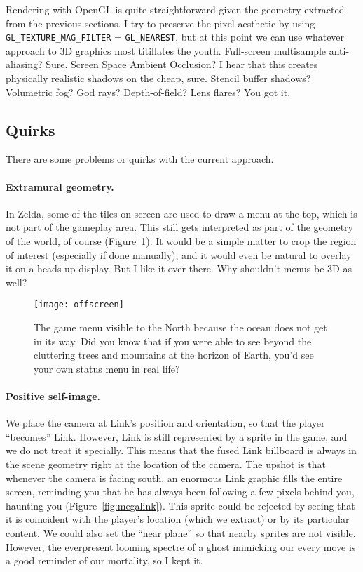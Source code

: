 \documentclass[twocolumn]{article}
\begin{document}
Rendering with OpenGL is quite straightforward given the geometry
extracted from the previous sections. I try to preserve the pixel
aesthetic by using \verb+GL_TEXTURE_MAG_FILTER+ = \verb+GL_NEAREST+,
but at this point we can use whatever approach to 3D graphics most
titillates the youth. Full-screen multisample anti-aliasing? Sure.
Screen Space Ambient Occlusion? I hear that this creates physically
realistic shadows on the cheap, sure. Stencil buffer shadows?
Volumetric fog? God rays? Depth-of-field? Lens flares? You got it.

\subsection{Quirks}
There are some problems or quirks with the current approach.

\paragraph{Extramural geometry.}
In Zelda, some of the tiles on screen are used to draw a menu at the
top, which is not part of the gameplay area. This still gets
interpreted as part of the geometry of the world, of course
(Figure~\ref{fig:offscreen}). It would be a simple matter to crop the
region of interest (especially if done manually), and it would even be
natural to overlay it on a heads-up display. But I like it over there.
Why shouldn't menus be 3D as well?

\begin{figure}[ht]
\begin{center}
\texttt{[image: offscreen]}
\end{center}\vspace{-0.1in}
\caption{ The game menu visible to the North because the ocean does
  not get in its way. Did you know that if you were able to see beyond
  the cluttering trees and mountains at the horizon of Earth, you'd
  see your own status menu in real life? } \label{fig:offscreen}
\end{figure}

\paragraph{Positive self-image.}
We place the camera at Link's position and orientation, so that the
player ``becomes'' Link. However, Link is still represented by a
sprite in the game, and we do not treat it specially. This means that
the fused Link billboard is always in the scene geometry right at the
location of the camera. The upshot is that whenever the camera is
facing south, an enormous Link graphic fills the entire screen,
reminding you that he has always been following a few pixels behind
you, haunting you (Figure~\ref{fig:megalink}). This sprite could be
rejected by seeing that it is coincident with the player's location
(which we extract) or by its particular content. We could also set the
``near plane'' so that nearby sprites are not visible. However, the
everpresent looming spectre of a ghost mimicking our every move is a
good reminder of our mortality, so I kept it.
\end{document}

